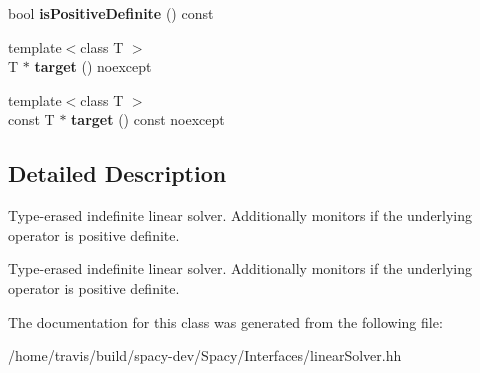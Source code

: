\begin{DoxyCompactItemize}
\item 
\hypertarget{classSpacy_1_1IndefiniteLinearSolver_a04191e6ed2c8cd54870c79a919dcae39}{bool {\bfseries is\-Positive\-Definite} () const }\label{classSpacy_1_1IndefiniteLinearSolver_a04191e6ed2c8cd54870c79a919dcae39}

\item 
\hypertarget{classSpacy_1_1IndefiniteLinearSolver_a6c0daed405c2671c8957848d731c0a1f}{{\footnotesize template$<$class T $>$ }\\T $\ast$ {\bfseries target} () noexcept}\label{classSpacy_1_1IndefiniteLinearSolver_a6c0daed405c2671c8957848d731c0a1f}

\item 
\hypertarget{classSpacy_1_1IndefiniteLinearSolver_a82c21063fa0c4b354d3e86db26ef125a}{{\footnotesize template$<$class T $>$ }\\const T $\ast$ {\bfseries target} () const noexcept}\label{classSpacy_1_1IndefiniteLinearSolver_a82c21063fa0c4b354d3e86db26ef125a}

\end{DoxyCompactItemize}


\subsection{Detailed Description}
Type-\/erased indefinite linear solver. Additionally monitors if the underlying operator is positive definite. 

Type-\/erased indefinite linear solver. Additionally monitors if the underlying operator is positive definite. 

The documentation for this class was generated from the following file\-:\begin{DoxyCompactItemize}
\item 
/home/travis/build/spacy-\/dev/\-Spacy/\-Interfaces/linear\-Solver.\-hh\end{DoxyCompactItemize}
